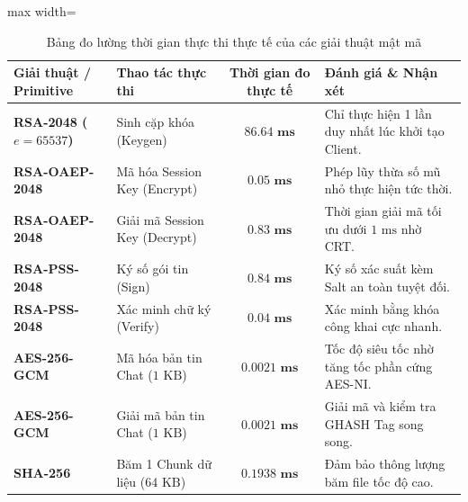 \documentclass[a4paper,12pt]{article}
\renewcommand{\arraystretch}{1.2}
\begin{document}
\begin{table}[H]
\centering
\renewcommand{\arraystretch}{1.2}
\begin{adjustbox}{max width=\textwidth}
\begin{tabular}{|l|l|c|p{6.8cm}|}
\hline
\textbf{Giải thuật / Primitive} & \textbf{Thao tác thực thi} & \textbf{Thời gian đo thực tế} & \textbf{Đánh giá \& Nhận xét} \\ \hline
\textbf{RSA-2048 ($e=65537$)} & Sinh cặp khóa (Keygen) & $\mathbf{86.64\text{ ms}}$ & Chỉ thực hiện 1 lần duy nhất lúc khởi tạo Client. \\ \hline
\textbf{RSA-OAEP-2048} & Mã hóa Session Key (Encrypt) & $\mathbf{0.05\text{ ms}}$ & Phép lũy thừa số mũ nhỏ thực hiện tức thời. \\ \hline
\textbf{RSA-OAEP-2048} & Giải mã Session Key (Decrypt) & $\mathbf{0.83\text{ ms}}$ & Thời gian giải mã tối ưu dưới $1\text{ ms}$ nhờ CRT. \\ \hline
\textbf{RSA-PSS-2048} & Ký số gói tin (Sign) & $\mathbf{0.84\text{ ms}}$ & Ký số xác suất kèm Salt an toàn tuyệt đối. \\ \hline
\textbf{RSA-PSS-2048} & Xác minh chữ ký (Verify) & $\mathbf{0.04\text{ ms}}$ & Xác minh bằng khóa công khai cực nhanh. \\ \hline
\textbf{AES-256-GCM} & Mã hóa bản tin Chat ($1\text{ KB}$) & $\mathbf{0.0021\text{ ms}}$ & Tốc độ siêu tốc nhờ tăng tốc phần cứng AES-NI. \\ \hline
\textbf{AES-256-GCM} & Giải mã bản tin Chat ($1\text{ KB}$) & $\mathbf{0.0021\text{ ms}}$ & Giải mã và kiểm tra GHASH Tag song song. \\ \hline
\textbf{SHA-256} & Băm 1 Chunk dữ liệu ($64\text{ KB}$) & $\mathbf{0.1938\text{ ms}}$ & Đảm bảo thông lượng băm file tốc độ cao. \\ \hline
\end{tabular}
\end{adjustbox}
\caption{Bảng đo lường thời gian thực thi thực tế của các giải thuật mật mã}
\label{tab:crypto_benchmark_real}
\end{table}
\end{document}
